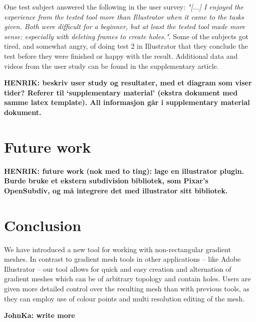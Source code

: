 \documentclass{egpubl}
\newcommand{\note}[3]{{\color{#2}\textbf{#1: #3}}}
\newcommand{\henrik}[1]{\note{HENRIK}{WildStrawberry}{#1}}
\newcommand{\john}[1]{\note{JohnKa}{ForestGreen}{#1}}
\begin{document}
One test subject answered the following in the user survey: \textit{"[...] I enjoyed the experience from the tested tool more than Illustrator when it came to the tasks given. Both were difficult for a beginner, but at least the tested tool made more sense: especially with deleting frames to create holes."}. Some of the subjects got tired, and somewhat angry, of doing test 2 in Illustrator that they conclude the test before they were finished or happy with the result. Additional data and videos from the user study can be found in the supplementary article. 

\henrik{beskriv user study og resultater, med et diagram som viser tider? Referer til `supplementary material' (ekstra dokument med samme latex template). All informasjon går i supplementary material dokument.}

\section{Future work}
\label{sec:FW}



\henrik{future work (nok med to ting): lage en illustrator plugin. Burde bruke et ekstern subdivision bibliotek, som Pixar's OpenSubdiv, og må integrere det med illustrator sitt bibliotek.}

\section{Conclusion}

We have introduced a new tool for working with non-rectangular gradient meshes. In contrast to gradient mesh tools in other applications -- like Adobe Illustrator -- our tool allows for quick and easy creation and alternation of gradient meshes which can be of arbitrary topology and contain holes. Users are given more detailed control over the resulting mesh than with previous tools, as they can employ use of colour points and multi resolution editing of the mesh.

\john{write more}




\end{document}
